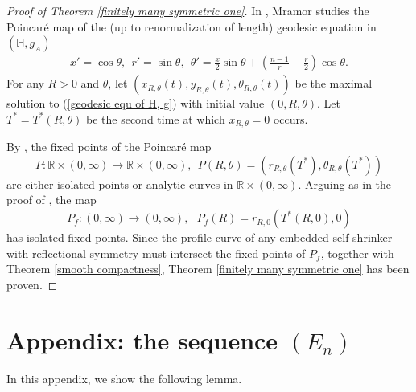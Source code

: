 \documentclass[12pt]{amsart}
\numberwithin{equation}{section}
\theoremstyle{remark}
\begin{document}
	\begin{proof}[Proof of Theorem \ref{finitely many symmetric one}] In \cite[section 5]{Alex}, Mramor studies the Poincar\'e map of the (up to renormalization of length) geodesic equation in $(\mathbb H, g_A)$
		\begin{align} \label{geodesic equ of H, g}
			x'=\cos \theta, \ \ r' = \sin \theta, \ \ \theta' = \frac{x}{2} \sin \theta + \left( \frac{n-1}{r} - \frac{r}{2}\right) \cos \theta.
		\end{align}
		For any $R >0$ and $\theta$, let $(x_{R,\theta}(t), y_{R, \theta} (t), \theta_{R, \theta} (t))$ be the maximal solution to (\ref{geodesic equ of H, g}) with initial value $(0, R, \theta)$. Let $T^* = T^* (R, \theta)$ be the second time at which $x_{R, \theta} = 0$ occurs. 
		
		By \cite[Lemma 5.1]{Alex}, the fixed points of the Poincar\'e map 
		$$ P : \mathbb R \times (0,\infty) \to \mathbb R \times (0,\infty), \ \ P(R, \theta) = (r_{R, \theta}(T^*), \theta_{R, \theta}(T^*))$$
		are either isolated points or analytic curves in $\mathbb R \times (0,\infty)$. Arguing as in the proof of \cite[Theorem 1.3]{Alex}, the map 
		$$P_f : (0,\infty) \to (0,\infty),\ \ \  P_f (R) = r_{R,0} (T^*(R,0), 0)$$
		has isolated fixed points. Since the profile curve of any embedded self-shrinker with reflectional symmetry must intersect the fixed points of $P_f$, together with Theorem \ref{smooth compactness}, Theorem \ref{finitely many symmetric one} has been proven. 
	\end{proof}
	
	\section{Appendix: the sequence $(E_n)$}
	In this appendix, we show the following lemma. 
	
\end{document}

